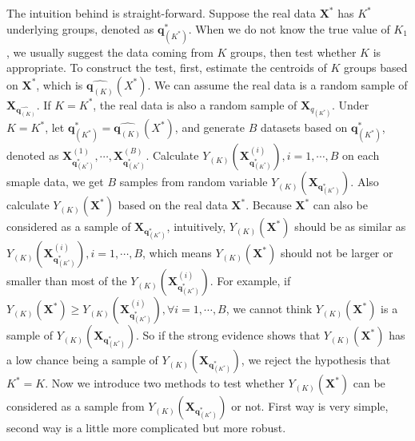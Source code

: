 \documentclass[12pt]{article}
\begin{document}
The intuition behind is straight-forward. Suppose the real data $\pmb X^*$ has $K^*$ underlying groups, denoted as $\pmb q_{(K^*)}^*$. When we do not know the true value of $K_1$, we usually suggest the data coming from $K$ groups, then test whether $K$ is appropriate. To construct the test, first, estimate the centroids of $K$ groups based on $\pmb X^*$, which is $\hat{\pmb q_{(K)}}(X^*)$.  We can assume the real data is a random sample of $\pmb X_{\hat{\pmb q_{(K)}}}$. If $K=K^*$, the real data is also a random sample of $\pmb X_{q_{(K^*)}}$. Under $K=K^*$, let $\pmb q_{(K^*)}^*= \hat{\pmb q_{(K)}}(X^*)$, and generate $B$ datasets based on $\pmb q_{(K^*)}^*$, denoted as $\pmb X_{\pmb q_{(K^*)}^*}^{(1)},\cdots,\pmb X_{\pmb q_{(K^*)}^*}^{(B)}$. Calculate $Y_{(K)}(\pmb X_{\pmb q_{(K^*)}^*}^{(i)}),i=1,\cdots,B$ on each smaple data, we get $B$ samples from random variable $Y_{(K)}(\pmb X_{\pmb q_{(K^*)}^*})$. Also calculate $Y_{(K)}(\pmb X^*)$ based on the real data $\pmb X^*$. Because $\pmb X^*$ can also be considered as a sample of $\pmb X_{\pmb q^*_{(K^*)}}$, intuitively, $Y_{(K)}(\pmb X^*)$ should be as similar as $Y_{(K)}(\pmb X_{\pmb q_{(K^*)}^*}^{(i)}),i=1,\cdots,B$, which means  $Y_{(K)}(\pmb X^*)$ should not be larger or smaller than most of the  $Y_{(K)}(\pmb X_{\pmb q_{(K^*)}^*}^{(i)})$. For example, if $Y_{(K)}(\pmb X^*) \geq Y_{(K)}(\pmb X_{\pmb q_{(K^*)}^*}^{(i)}),\forall i=1,\cdots,B$, we cannot think $Y_{(K)}(\pmb X^*)$ is a sample of $Y_{(K)}(\pmb X_{\pmb q_{(K^*)}^*})$. So if the strong evidence shows that $Y_{(K)}(\pmb X^*)$ has a low chance being a sample of $Y_{(K)}(\pmb X_{\pmb q_{(K^*)}^*})$, we reject the hypothesis that $K^*=K$. Now we introduce two methods to test whether $Y_{(K)}(\pmb X^*)$ can be considered as a sample from $Y_{(K)}(\pmb X_{\pmb q_{(K^*)}^*})$ or not. First way is very simple, second way is a little more complicated but more robust.
\end{document}
